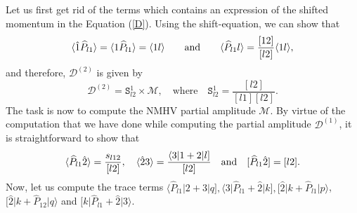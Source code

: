 Let us first get rid of the terms which contains an expression of the shifted momentum in the Equation (\ref{D}). Using the shift-equation, we can show that
\begin{equation}
\langle\hat{1} \widehat{P}_{l1}\rangle=\langle1\widehat{P}_{l1}\rangle=\langle1l\rangle \qquad \text{and} \qquad \langle\widehat{P}_{l1} l\rangle=\frac{[12]}{[l2]} \langle1l\rangle,
\end{equation}
and therefore, $\mathcal{D}^{(2)}$ is given by
\begin{equation}
\mathcal{D}^{(2)}=\mathtt{S}^1_{l2} \times \mathcal{M}, \quad \text{where} \quad \mathtt{S}^1_{l2}=\frac{[l2]}{[l1] [l2]}.
\end{equation}
The task is now to compute the NMHV partial amplitude $\mathcal{M}$. By virtue of the computation that we have done while computing the partial amplitude $\mathcal{D}^{(1)}$, it is straightforward to show that 
\begin{equation}
\langle\widehat{P}_{l1} \hat{2}\rangle=\frac{s_{l12}}{[l2]}, \quad \langle\hat{2}3\rangle=\frac{\langle 3 \vert 1+2\vert l]}{[l2]} \quad \text{and} \quad [\widehat{P}_{l1} \hat{2}]=[l2].
\end{equation}
Now, let us compute the trace terms $\langle \widehat{P}_{l1} \vert 2+3\vert q], \langle 3\vert \widehat{P}_{l1} +\hat{2} \vert k], [\hat{2} \vert k+\widehat{P}_{l1} \vert p\rangle$, \mbox{$[\hat{2} \vert k+\widehat{P}_{12} \vert q\rangle$} and $[k\vert \widehat{P}_{l1}+\hat{2}\vert 3\rangle$.
